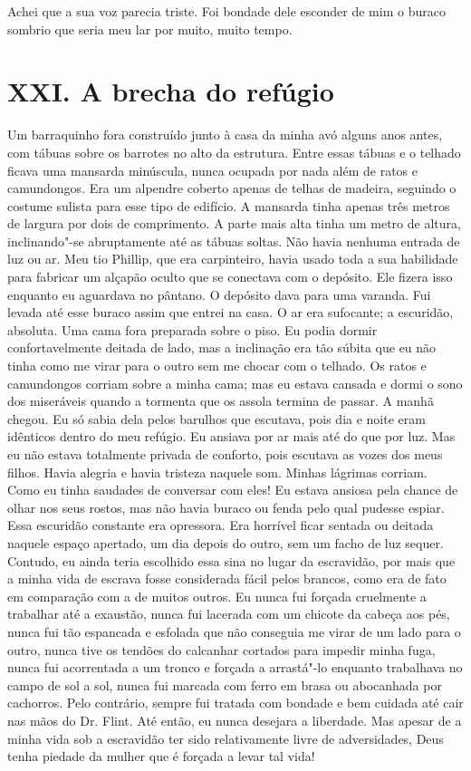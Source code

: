 Achei que a sua voz parecia triste. Foi
bondade dele esconder de mim o buraco sombrio que seria meu lar por
muito, muito tempo.

\chapter{XXI. A brecha do refúgio}

Um barraquinho fora construído junto à
casa da minha avó alguns anos antes, com tábuas sobre os barrotes no
alto da estrutura. Entre essas tábuas e o telhado ficava uma mansarda
minúscula, nunca ocupada por nada além de ratos e camundongos. Era um
alpendre coberto apenas de telhas de madeira, seguindo o costume sulista
para esse tipo de edifício. A mansarda tinha apenas três metros de
largura por dois de comprimento. A parte mais alta tinha um metro de
altura, inclinando"-se abruptamente até as tábuas soltas. Não havia
nenhuma entrada de luz ou ar. Meu tio Phillip, que era carpinteiro,
havia usado toda a sua habilidade para fabricar um alçapão oculto que se
conectava com o depósito. Ele fizera isso enquanto eu aguardava no
pântano. O depósito dava para uma varanda. Fui levada até esse buraco
assim que entrei na casa. O ar era sufocante; a escuridão, absoluta. Uma
cama fora preparada sobre o piso. Eu podia dormir confortavelmente
deitada de lado, mas a inclinação era tão súbita que eu não tinha como
me virar para o outro sem me chocar com o telhado. Os ratos e
camundongos corriam sobre a minha cama; mas eu estava cansada e dormi o
sono dos miseráveis quando a tormenta que os assola termina de passar. A
manhã chegou. Eu só sabia dela pelos barulhos que escutava, pois dia e
noite eram idênticos dentro do meu refúgio. Eu ansiava por ar mais até
do que por luz. Mas eu não estava totalmente privada de conforto, pois
escutava as vozes dos meus filhos. Havia alegria e havia tristeza
naquele som. Minhas lágrimas corriam. Como eu tinha saudades de
conversar com eles! Eu estava ansiosa pela chance de olhar nos seus
rostos, mas não havia buraco ou fenda pelo qual pudesse espiar. Essa
escuridão constante era opressora. Era horrível ficar sentada ou deitada
naquele espaço apertado, um dia depois do outro, sem um facho de luz
sequer. Contudo, eu ainda teria escolhido essa sina no lugar da
escravidão, por mais que a minha vida de escrava fosse considerada fácil
pelos brancos, como era de fato em comparação com a de muitos outros.
Eu nunca fui forçada cruelmente a
trabalhar até a exaustão, nunca fui lacerada com um chicote da cabeça
aos pés, nunca fui tão espancada e esfolada que não conseguia me virar
de um lado para o outro, nunca tive os tendões do calcanhar cortados
para impedir minha fuga, nunca fui acorrentada a um tronco e forçada a
arrastá"-lo enquanto trabalhava no campo de sol a sol, nunca fui marcada
com ferro em brasa ou abocanhada por cachorros. Pelo contrário, sempre
fui tratada com bondade e bem cuidada até cair nas mãos do Dr. Flint.
Até então, eu nunca desejara a liberdade. Mas apesar de a minha vida sob
a escravidão ter sido relativamente livre de adversidades, Deus tenha
piedade da mulher que é forçada a levar tal vida!

